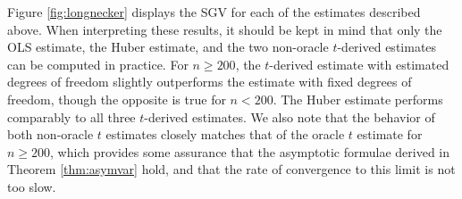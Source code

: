 \documentclass[12pt]{article}
\begin{document}
Figure \ref{fig:longnecker} displays the SGV for each of the estimates described above. When interpreting these results, it should be kept in mind that only the OLS estimate, the Huber estimate, and the two non-oracle $t$-derived estimates can be computed in practice. For $n \geq 200$, the $t$-derived estimate with estimated degrees of freedom slightly outperforms the estimate with fixed degrees of freedom, though the opposite is true for $n < 200$. The Huber estimate performs comparably to all three $t$-derived estimates. We also note that the behavior of both non-oracle $t$ estimates closely matches that of the oracle $t$ estimate for $n \geq 200$, which provides some assurance that the asymptotic formulae derived in Theorem \ref{thm:asymvar} hold, and that the rate of convergence to this limit is not too slow.
\end{document}
